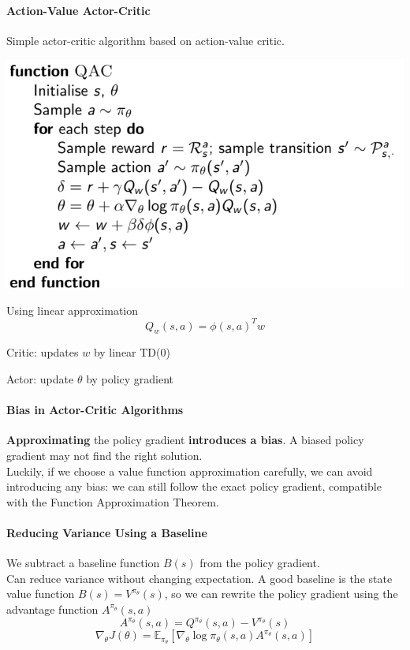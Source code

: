 \documentclass[10pt]{report}
\begin{document}
\paragraph{Action-Value Actor-Critic}
Simple actor-critic algorithm based on action-value critic.
\begin{center}
	\includegraphics[scale=0.5]{184.png}
\end{center}
Using linear approximation $$Q_w(s,a) = \phi(s,a)^Tw$$
\begin{list}{}{}
	\item Critic: updates $w$ by linear TD(0)
	\item Actor: update $\theta$ by policy gradient
\end{list}
\paragraph{Bias in Actor-Critic Algorithms} \textbf{Approximating} the policy gradient \textbf{introduces a bias}. A biased policy gradient may not find the right solution.\\
Luckily, if we choose a value function approximation carefully, we can avoid introducing any bias: we can still follow the exact policy gradient, compatible with the Function Approximation Theorem.
\paragraph{Reducing Variance Using a Baseline} We subtract a baseline function $B(s)$ from the policy gradient.\\
Can reduce variance without changing expectation. A good baseline is the state value function $B(s) = V^{\pi_\theta}(s)$, so we can rewrite the policy gradient using the advantage function $A^{\pi_\theta}(s,a)$
$$A^{\pi_\theta}(s,a) =Q^{\pi_\theta}(s,a)-V^{\pi_\theta}(s)$$
$$\nabla_\theta J(\theta) = \mathbb{E}_{\pi_\theta}[\nabla_\theta\log\pi_\theta(s,a)A^{\pi_\theta}(s,a)]$$
\end{document}
